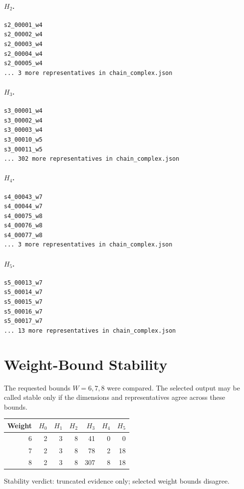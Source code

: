 \documentclass[11pt]{article}
\begin{document}
\paragraph{\(H_2\).}
\begin{verbatim}
s2_00001_w4
s2_00002_w4
s2_00003_w4
s2_00004_w4
s2_00005_w4
... 3 more representatives in chain_complex.json
\end{verbatim}
\paragraph{\(H_3\).}
\begin{verbatim}
s3_00001_w4
s3_00002_w4
s3_00003_w4
s3_00010_w5
s3_00011_w5
... 302 more representatives in chain_complex.json
\end{verbatim}
\paragraph{\(H_4\).}
\begin{verbatim}
s4_00043_w7
s4_00044_w7
s4_00075_w8
s4_00076_w8
s4_00077_w8
... 3 more representatives in chain_complex.json
\end{verbatim}
\paragraph{\(H_5\).}
\begin{verbatim}
s5_00013_w7
s5_00014_w7
s5_00015_w7
s5_00016_w7
s5_00017_w7
... 13 more representatives in chain_complex.json
\end{verbatim}

\section{Weight-Bound Stability}
The requested bounds $W=6,7,8$ were compared.  The selected output may be called stable only if the dimensions and representatives agree across these bounds.

\begin{center}
\begin{tabular}{rrrrrrr}
\toprule
Weight & \(H_0\) & \(H_1\) & \(H_2\) & \(H_3\) & \(H_4\) & \(H_5\) \\
\midrule
6 & 2 & 3 & 8 & 41 & 0 & 0 \\
7 & 2 & 3 & 8 & 78 & 2 & 18 \\
8 & 2 & 3 & 8 & 307 & 8 & 18 \\
\bottomrule
\end{tabular}
\end{center}

Stability verdict: truncated evidence only; selected weight bounds disagree.
\end{document}
